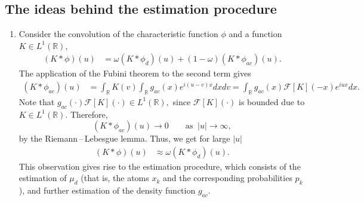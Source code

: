 \documentclass[numbers,webpdf,imaiai]{ima-authoring-template}%
\theoremstyle{thmstyletwo}%
\newcommand{\R}{\mathbb{R}}
\newcommand{\F}{\mathcal{F}}
\newcommand{\I}{{\mathrm{I}}}
\newcommand{\w}{\omega}
\numberwithin{equation}{section}
\begin{document}
\subsection{The ideas behind the estimation procedure}  
\begin{enumerate} 
\item Consider the convolution of the characteristic function $\phi$ and a function $K \in L^1(\R)$,
\begin{align}
    (K * \phi)(u) &= 
        \w (K * \phi_d)(u) +   (1-\w)  (K * \phi_{ac})(u).%
\end{align}
The application of the Fubini theorem to the second term gives
\begin{align*}
    (K * \phi_{ac})(u) &=
     \int_{\R} K(v)\int_{\R}g_{ac}(x)e^{i(u - v)x}dx dv 
     =
\int_{\R} g_{ac}(x)\F[K](-x)e^{iux} dx.
\end{align*}
Note that  \(g_{ac}(\cdot)\F[K](\cdot) \in L^1(\R),\) since \(\F[K](\cdot)\) is bounded due to \(K \in L^1(\R)\). Therefore, 
\begin{equation*}
	(K * \phi_{ac})(u)  \to 0  \qquad  \text{as} \;\; |u|  \to \infty,
\end{equation*} 
by the Riemann\,--\,Lebesgue lemma.
Thus, we get for large \(|u|\)
\begin{align}\label{approx}
    (K * \phi)(u) &\approx \w (K * \phi_d)(u).
\end{align}
This observation  gives rise to the estimation procedure, which consists of the  estimation of \(\mu_d\) (that is, the atoms \(x_k\) and the corresponding probabilities \(p_k\)), and further estimation of the density function \(g_{ac}.\) \newline 


\end{enumerate}
\end{document}
